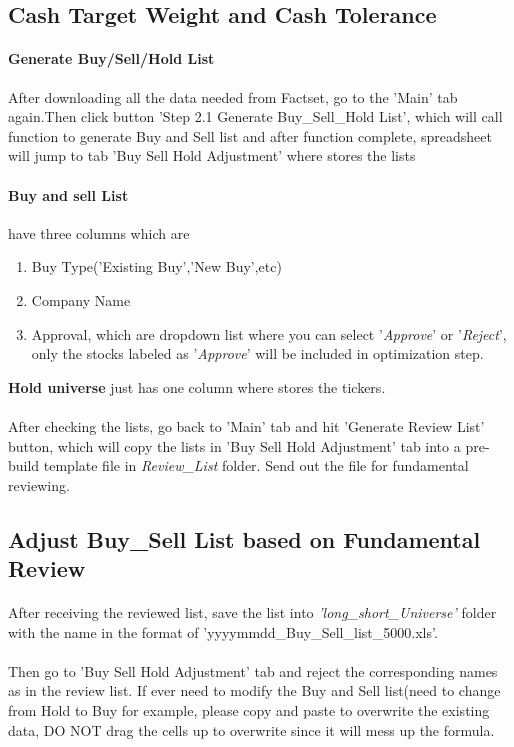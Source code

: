 \documentclass[12pt,letterpaper,twoside]{article}
\begin{document}
\subsection{Cash Target Weight and Cash Tolerance}\label{buysell}
\paragraph{Generate Buy/Sell/Hold List}
After downloading all the data needed from Factset, go to the 'Main' tab again.Then click button 'Step 2.1 Generate Buy\_Sell\_Hold List', which will call function to generate Buy and Sell list and after function complete, spreadsheet will jump to tab 'Buy Sell Hold Adjustment' where stores the lists
\paragraph{Buy and sell List} have three columns which are
\begin{enumerate}
  \item Buy Type('Existing Buy','New Buy',etc)
  \item Company Name
  \item Approval, which are dropdown list where you can select '\emph{Approve}' or '\emph{Reject}', only the stocks labeled as '\emph{Approve}' will be included in optimization step.
\end{enumerate}
\textbf{Hold universe} just has one column where stores the tickers.
\paragraph{} After checking the lists, go back to 'Main' tab and hit 'Generate Review List' button, which will copy the lists in 'Buy Sell Hold Adjustment' tab into a pre-build template file in \emph{Review\_List} folder. Send out the file for fundamental reviewing.

\subsection{Adjust Buy\_Sell List based on Fundamental Review }\label{adj}
\paragraph{} After receiving the reviewed list, save the list into \emph{'long\_short\_Universe'} folder with the name in the format of {\color{blue}'yyyymmdd\_Buy\_Sell\_list\_5000.xls'}.
\paragraph{} Then go to 'Buy Sell Hold Adjustment' tab and reject the corresponding names as in the review list. If ever need to modify the Buy and Sell list(need to change from {\color{cyan}Hold} to {\color{green}Buy} for example, please copy and paste to overwrite the existing data, {\color{red}DO NOT} drag the cells up to overwrite since it will mess up the formula.
\end{document}
